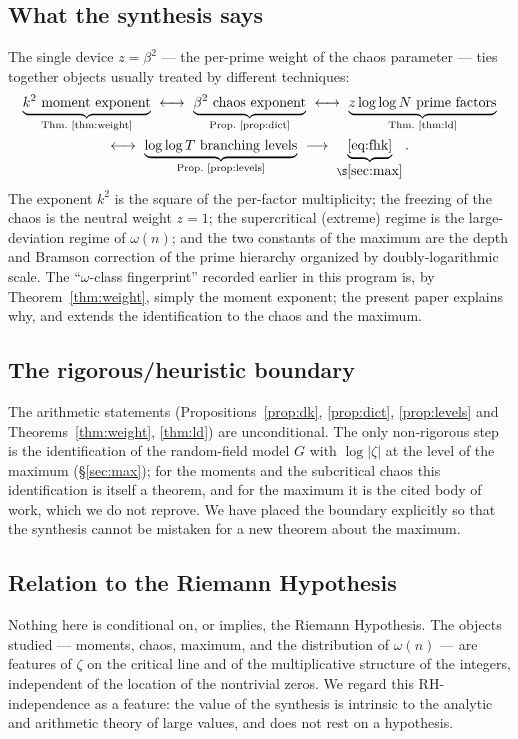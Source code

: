 \documentclass[11pt]{amsart}
\theoremstyle{definition}
\newcommand{\loglog}{\log\log}
\begin{document}
\subsection{What the synthesis says}
The single device $z=\beta^2$ --- the per-prime weight of the chaos parameter --- ties together objects usually
treated by different techniques:
\begin{multline*}
\underbrace{k^2\text{ moment exponent}}_{\text{Thm.~\ref{thm:weight}}}
\ \longleftrightarrow\
\underbrace{\beta^2\text{ chaos exponent}}_{\text{Prop.~\ref{prop:dict}}}
\ \longleftrightarrow\
\underbrace{z\loglog N\text{ prime factors}}_{\text{Thm.~\ref{thm:ld}}}\\
\longleftrightarrow\
\underbrace{\loglog T\text{ branching levels}}_{\text{Prop.~\ref{prop:levels}}}
\ \longrightarrow\
\underbrace{\eqref{eq:fhk}}_{\S\ref{sec:max}}.
\end{multline*}
The exponent $k^2$ is the square of the per-factor multiplicity; the freezing of the chaos is the neutral weight
$z=1$; the supercritical (extreme) regime is the large-deviation regime of $\omega(n)$; and the two constants of
the maximum are the depth and Bramson correction of the prime hierarchy organized by doubly-logarithmic scale.
The ``$\omega$-class fingerprint'' recorded earlier in this program is, by Theorem~\ref{thm:weight}, simply the
moment exponent; the present paper explains why, and extends the identification to the chaos and the maximum.

\subsection{The rigorous/heuristic boundary}
The arithmetic statements (Propositions~\ref{prop:dk}, \ref{prop:dict}, \ref{prop:levels} and
Theorems~\ref{thm:weight}, \ref{thm:ld}) are unconditional. The only non-rigorous step is the identification of
the random-field model $G$ with $\log|\zeta|$ at the level of the maximum (\S\ref{sec:max}); for the moments and
the subcritical chaos this identification is itself a theorem, and for the maximum it is the cited body of work,
which we do not reprove. We have placed the boundary explicitly so that the synthesis cannot be mistaken for a
new theorem about the maximum.

\subsection{Relation to the Riemann Hypothesis}
Nothing here is conditional on, or implies, the Riemann Hypothesis. The objects studied --- moments, chaos,
maximum, and the distribution of $\omega(n)$ --- are features of $\zeta$ on the critical line and of the
multiplicative structure of the integers, independent of the location of the nontrivial zeros. We regard this
RH-independence as a feature: the value of the synthesis is intrinsic to the analytic and arithmetic theory of
large values, and does not rest on a hypothesis.
\end{document}
